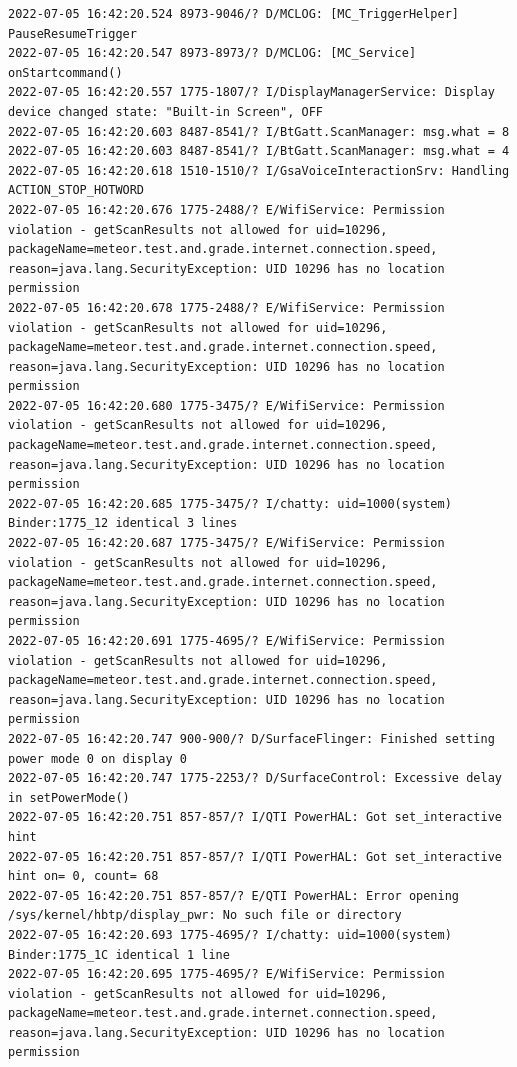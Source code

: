 \documentclass[a4paper,12pt]{book}
\begin{document}
\begin{lstlisting}
2022-07-05 16:42:20.524 8973-9046/? D/MCLOG: [MC_TriggerHelper] PauseResumeTrigger
2022-07-05 16:42:20.547 8973-8973/? D/MCLOG: [MC_Service] onStartcommand()
2022-07-05 16:42:20.557 1775-1807/? I/DisplayManagerService: Display device changed state: "Built-in Screen", OFF
2022-07-05 16:42:20.603 8487-8541/? I/BtGatt.ScanManager: msg.what = 8
2022-07-05 16:42:20.603 8487-8541/? I/BtGatt.ScanManager: msg.what = 4
2022-07-05 16:42:20.618 1510-1510/? I/GsaVoiceInteractionSrv: Handling ACTION_STOP_HOTWORD
2022-07-05 16:42:20.676 1775-2488/? E/WifiService: Permission violation - getScanResults not allowed for uid=10296, packageName=meteor.test.and.grade.internet.connection.speed, reason=java.lang.SecurityException: UID 10296 has no location permission
2022-07-05 16:42:20.678 1775-2488/? E/WifiService: Permission violation - getScanResults not allowed for uid=10296, packageName=meteor.test.and.grade.internet.connection.speed, reason=java.lang.SecurityException: UID 10296 has no location permission
2022-07-05 16:42:20.680 1775-3475/? E/WifiService: Permission violation - getScanResults not allowed for uid=10296, packageName=meteor.test.and.grade.internet.connection.speed, reason=java.lang.SecurityException: UID 10296 has no location permission
2022-07-05 16:42:20.685 1775-3475/? I/chatty: uid=1000(system) Binder:1775_12 identical 3 lines
2022-07-05 16:42:20.687 1775-3475/? E/WifiService: Permission violation - getScanResults not allowed for uid=10296, packageName=meteor.test.and.grade.internet.connection.speed, reason=java.lang.SecurityException: UID 10296 has no location permission
2022-07-05 16:42:20.691 1775-4695/? E/WifiService: Permission violation - getScanResults not allowed for uid=10296, packageName=meteor.test.and.grade.internet.connection.speed, reason=java.lang.SecurityException: UID 10296 has no location permission
2022-07-05 16:42:20.747 900-900/? D/SurfaceFlinger: Finished setting power mode 0 on display 0
2022-07-05 16:42:20.747 1775-2253/? D/SurfaceControl: Excessive delay in setPowerMode()
2022-07-05 16:42:20.751 857-857/? I/QTI PowerHAL: Got set_interactive hint
2022-07-05 16:42:20.751 857-857/? I/QTI PowerHAL: Got set_interactive hint on= 0, count= 68
2022-07-05 16:42:20.751 857-857/? E/QTI PowerHAL: Error opening /sys/kernel/hbtp/display_pwr: No such file or directory
2022-07-05 16:42:20.693 1775-4695/? I/chatty: uid=1000(system) Binder:1775_1C identical 1 line
2022-07-05 16:42:20.695 1775-4695/? E/WifiService: Permission violation - getScanResults not allowed for uid=10296, packageName=meteor.test.and.grade.internet.connection.speed, reason=java.lang.SecurityException: UID 10296 has no location permission

\end{lstlisting}
\end{document}

